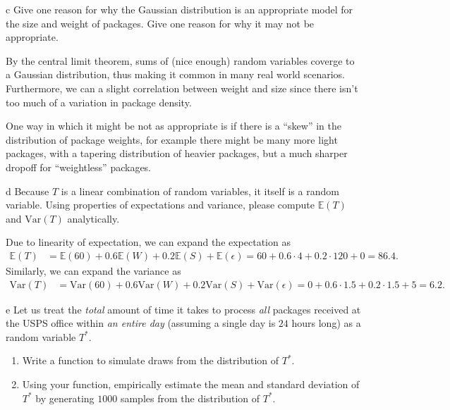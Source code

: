 \documentclass[expanded]{pset}
\begin{document}
\begin{parts}
  \begin{part}{c}
     Give one reason for why the Gaussian distribution is an appropriate model for the size and weight of packages. Give one reason for why it may not be appropriate.
  \end{part}

  By the central limit theorem, sums of (nice enough) random variables coverge to a Gaussian distribution, thus making it common in many real world scenarios. Furthermore, we can a slight correlation between weight and size since there isn't too much of a variation in package density.

  One way in which it might be not as appropriate is if there is a ``skew'' in the distribution of package weights, for example there might be many more light packages, with a tapering distribution of heavier packages, but a much sharper dropoff for ``weightless'' packages.

  \begin{part}{d}
    Because $T$ is a linear combination of random variables, it itself is a random variable. Using properties of expectations and variance, please compute $\mathbb{E}(T)$ and $\mathrm{Var}(T)$ analytically.
  \end{part}

  Due to linearity of expectation, we can expand the expectation as
  \[
    \begin{aligned}
      \mathbb{E}(T) &= \mathbb{E}(60)+0.6\mathbb{E}(W) + 0.2\mathbb{E}(S)+\mathbb{E}(\epsilon) = 60+0.6\cdot 4 + 0.2\cdot 120 + 0 = 86.4.
    \end{aligned}
  \]
  Similarly, we can expand the variance as 
  \[
    \begin{aligned}
      \mathrm{Var}(T) &= \mathrm{Var}(60)+0.6\mathrm{Var}(W) + 0.2\mathrm{Var}(S)+\mathrm{Var}(\epsilon) = 0 + 0.6\cdot 1.5 + 0.2\cdot 1.5 + 5 = 6.2.
    \end{aligned}
  \]

  \begin{part}{e}
     Let us treat the \textit{total} amount of time it takes to process \textit{all} packages received at the USPS office within \textit{an entire day} (assuming a single day is $24$ hours long) as a random variable $T^{*}$. 
    \begin{enumerate}
        \item Write a function to simulate draws from the distribution of $T^{*}$. 
        \item Using your function, empirically estimate the mean and standard deviation of $T^{*}$ by generating $1000$ samples from the distribution of $T^{*}$.
    \end{enumerate}
  \end{part}


\end{parts}
\end{document}
